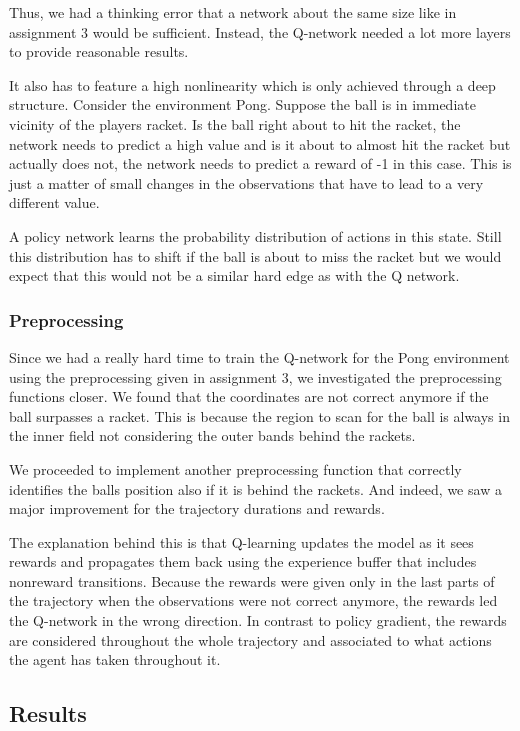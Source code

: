 \documentclass[10pt,a4paper]{article}
\begin{document}
Thus, we had a thinking error that a network about the same size like in assignment 3 would be sufficient. Instead, the Q-network needed a lot more layers to provide reasonable results.

It also has to feature a high nonlinearity which is only achieved through a deep structure. Consider the environment Pong. Suppose the ball is in immediate vicinity of the players racket. Is the ball right about to hit the racket, the network needs to predict a high value and is it about to almost hit the racket but actually does not, the network needs to predict a reward of -1 in this case. This is just a matter of small changes in the observations that have to lead to a very different value.

A policy network learns the probability distribution of actions in this state. Still this distribution has to shift if the ball is about to miss the racket but we would expect that this would not be a similar hard edge as with the Q network.

\subsubsection{Preprocessing}
Since we had a really hard time to train the Q-network for the Pong environment using the preprocessing given in assignment 3, we investigated the preprocessing functions closer. We found that the coordinates are not correct anymore if the ball surpasses a racket. This is because the region to scan for the ball is always in the inner field not considering the outer bands behind the rackets.

We proceeded to implement another preprocessing function that correctly identifies the balls position also if it is behind the rackets. And indeed, we saw a major improvement for the trajectory durations and rewards.

The explanation behind this is that Q-learning updates the model as it sees rewards and propagates them back using the experience buffer that includes nonreward transitions. Because the rewards were given only in the last parts of the trajectory when the observations were not correct anymore, the rewards led the Q-network in the wrong direction. In contrast to policy gradient, the rewards are considered throughout the whole trajectory and associated to what actions the agent has taken throughout it.

\subsection{Results}
\end{document}
